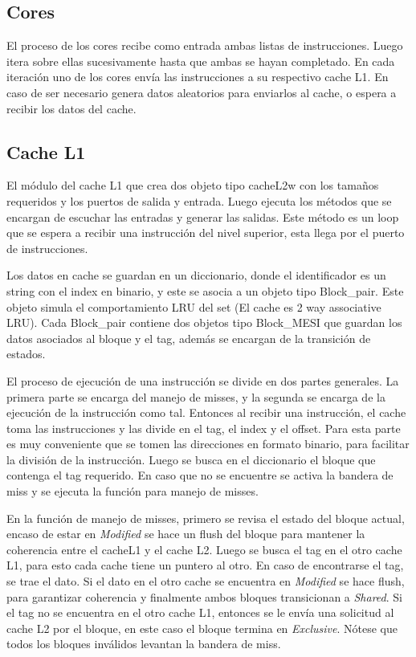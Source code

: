 \documentclass {article}
\begin{document}
\subsection{Cores}

El proceso de los cores recibe como entrada ambas listas de instrucciones. Luego itera sobre ellas
sucesivamente hasta que ambas se hayan completado. En cada iteración uno de los cores envía las
instrucciones a su respectivo cache L1. En caso de ser necesario genera datos aleatorios para
enviarlos al cache, o espera a recibir los datos del cache. 


\subsection{Cache L1}
El módulo del cache L1 que crea dos objeto tipo cacheL2w con los tamaños requeridos y los puertos de
salida y entrada. Luego ejecuta los métodos que se encargan de escuchar las entradas y generar las
salidas. Este método es un loop que se espera a recibir una instrucción del nivel superior, esta
llega por el puerto de instrucciones.

Los datos en cache se guardan en un diccionario, donde el identificador es un string con el index en
binario, y este se asocia a un objeto tipo Block\_pair. Este objeto simula el comportamiento LRU del
set (El cache es 2 way associative LRU). Cada Block\_pair contiene dos objetos tipo Block\_MESI que
guardan los datos asociados al bloque y el tag, además se encargan de la transición de estados. 

El proceso de ejecución de una instrucción se divide en dos partes generales. La primera parte se
encarga del manejo de misses, y la segunda se encarga de la ejecución de la instrucción como
tal. Entonces al recibir una instrucción, el cache toma las instrucciones y las divide en el tag, el
index y el offset. Para esta parte es muy conveniente que se tomen las direcciones en formato
binario, para facilitar la división de la instrucción. Luego se busca en el diccionario el bloque
que contenga el tag requerido. En caso que no se encuentre se activa la bandera de miss y se ejecuta
la función para manejo de misses.

En la función de manejo de misses, primero se revisa el estado del bloque actual, encaso de estar en
\textit{Modified} se hace un flush del bloque para mantener la coherencia entre el cacheL1 y el cache
L2. Luego se busca el tag en el otro cache L1, para esto cada cache tiene un puntero al otro. En
caso de encontrarse el tag, se trae el dato. Si el dato en el otro cache se encuentra en \textit{Modified} se
hace flush, para garantizar coherencia y finalmente ambos bloques transicionan a \textit{Shared}. Si el tag
no se encuentra en el otro cache L1, entonces se le envía una solicitud al cache L2 por el
bloque, en este caso el bloque termina en \textit{Exclusive}. Nótese que todos los bloques inválidos levantan
la bandera de miss. 
\end{document}
